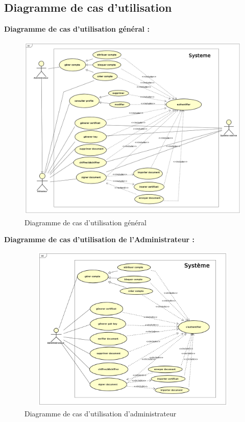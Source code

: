 \documentclass[12pt,a4paper]{article}
\begin{document}
	\subsection{Diagramme de cas d'utilisation}	
		\textbf{Diagramme de cas d'utilisation général  : }\\
			\begin{figure}[H]
					\centering		
					\includegraphics[width=18cm, height=9cm]{../Diagrammes/DiagrammeDeCasDutilisation/diagrammeGeneral.png} 
					\caption{Diagramme de cas d'utilisation général}
					\label{fig2}
			\end{figure}
			
		\textbf{Diagramme de cas d'utilisation de l'Administrateur :}
			\begin{figure}[H]
					\centering		
					\includegraphics[width=18cm, height=8cm]{../Diagrammes/DiagrammeDeCasDutilisation/admin.png}  
					\caption{Diagramme de cas d'utilisation d'administrateur}
					\label{fig3}
			\end{figure}
		
\end{document}
